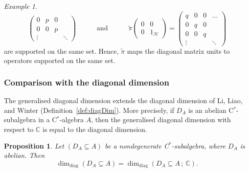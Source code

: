 \documentclass[a4paper]{amsart}
\newcommand{\myhyp}{\textnormal{-}\hskip0pt\relax}
\numberwithin{equation}{section}
\newcommand{\C}{\mathbb{C}}
\newcommand{\Hcal}{\mathcal{H}}
\newcommand{\cstar}{C$^\ast$\myhyp{}algebra}
\newcommand{\cstarSub}{C$^\ast$\myhyp{}subalgebra}
\newcommand{\ddim}[2]{\dim_{\mathrm{diag}}({#1}\subseteq{#2})}
\newcommand{\ddimn}[3]{\dim_{\mathrm{diag}}({#1}\subseteq{#2}\, ;~{#3})}
\theoremstyle{plain}
\newtheorem{propo}[thm]{Proposition}
\theoremstyle{indented}
\numberwithin{equation}{section}
\theoremstyle{definition}
\theoremstyle{remark}
\newtheorem{example}[thm]{Example}
\theoremstyle{plain}
\theoremstyle{definition}
\begin{document}
\begin{example}
\[\begin{pmatrix}
            0           & p    & 0 &  \\
            0           & 0             & p    &  \\
            \vdots       &     &  & \ddots 
        \end{pmatrix} 
        \phantom{==} \text{ and } \phantom{==} 
        \widetilde{\pi} \begin{pmatrix}
        0 & 0 \\
        0 & 1_{\Hcal}
    \end{pmatrix} = \begin{pmatrix}
            q  & 0             & 0 & \hdots\\
            0           & q    & 0 &  \\
            0           & 0             & q    &  \\
            \vdots       &     &  & \ddots 
        \end{pmatrix}\]
        are supported on the same set.
        Hence,
        ${\widetilde{\pi}}$ maps the diagonal matrix units to operators supported on the same set.
\end{example}


\medskip
\subsubsection{Comparison with the diagonal dimension}

The generalised diagonal dimension extends the diagonal dimension of Li, Liao, and Winter (Definition~\ref{def:diagDim}).
More precisely, if $D_A$ is an abelian \cstarSub{} in a \cstar{} $A$, then
the generalised diagonal dimension with respect to $\C$ is equal to the diagonal dimension.

\begin{propo} \label{prop:genDiagDimExtendsDiagDim}
    Let ${(D_A \subseteq A)}$ be a nondegenerate \cstarSub{}, where $D_A$ is abelian.
    Then 
    \begin{equation*}
        \ddim{D_A}{A} = \ddimn{D_A}{A}{\mathbb{C}}.
    \end{equation*}
\end{propo}
\end{document}

